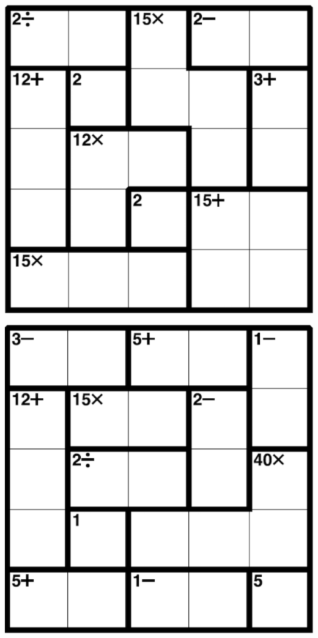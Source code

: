 
\includegraphics[scale=1]{Gambar/Lampiran/5x5_19.png}

\includegraphics[scale=1]{Gambar/Lampiran/5x5_20.png}
